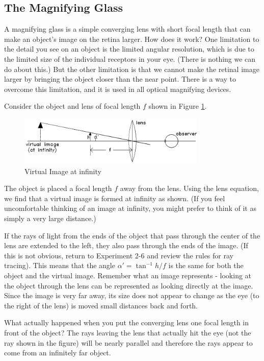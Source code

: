 \subsection{The Magnifying Glass}

A magnifying glass is a simple converging lens with short focal length that can make an object's image on the retina larger. How does it work? One limitation to the detail you see on an object is the limited angular resolution, which is due to the limited size of the individual receptors in your eye. (There is nothing we can do about this.) But the other limitation is that we cannot make the retinal image larger by bringing the object closer than the near point. There is a way to overcome this limitation, and it is used in all optical magnifying devices.\myskip

Consider the object and lens of focal length $f$ shown in Figure \ref{fig:virtualinf}.\myskip
\begin{figure}[h]
\centering
\includegraphics[width=0.8\textwidth]{./Exp7/pic/image2.png}
\caption{Virtual Image at infinity}
\label{fig:virtualinf}
\end{figure}

The object is placed a focal length $f$ away from the lens. Using the lens equation, we find that a virtual image is formed at infinity as shown. (If you feel uncomfortable thinking of an image at infinity, you might prefer to think of it as simply a very large distance.)\myskip

If the rays of light from the ends of the object that pass through the center of the lens are extended to the left, they also pass through the ends of the image. (If this is not obvious, return to Experiment 2-6 and review the rules for ray tracing). This means that the angle $\alpha'=\tan^{-1}h/f$ is the same for both the object and the virtual image. Remember what an image represents - looking at the object through the lens can be represented as looking directly at the image. Since the image is very far away, its size does not appear to change as the eye (to the right of the lens) is moved small distances back and forth. \myskip

What actually happened when you put the converging lens one focal length in front of the object? The rays leaving the lens that actually hit the eye (not the ray shown in the figure) will be nearly parallel and therefore the rays appear to come from an infinitely far object.\myskip

